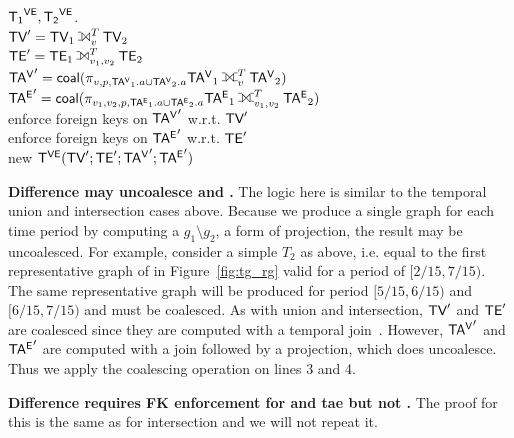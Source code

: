 \begin{algorithm}[b]
\caption{Temporal graph difference in \tve.}
\begin{algorithmic}[1]
\REQUIRE $\mathsf{{T_1}^{VE}}, \mathsf{{T_2}^{VE}}$.\\
\STATE $\tv' = \tv_1 \leftouterjoin^T_v \tv_2$\\ 
\STATE $\te' = \te_1 \leftouterjoin^T_{v_1,v_2} \te_2$\\ 
\STATE $\tav' = \cl (\pi_{v,p,\tav_1.a \cup \tav_2.a}\tav_1 \fullouterjoin^T_v \tav_2)$\\
\STATE $\tae' = \cl (\pi_{v_1,v_2,p,\tae_1.a \cup \tae_2.a}\tae_1 \fullouterjoin^T_{v_1,v_2} \tae_2)$\\
\STATE enforce foreign keys on $\mathsf{TA^{V}}'$ w.r.t. $\textsf{TV}'$\\ 
\STATE enforce foreign keys on $\mathsf{TA^{E}}'$ w.r.t. $\textsf{TE}'$\\ 
\RETURN new $\mathsf{T^{VE}} (\textsf{TV}';\textsf{TE}';\mathsf{TA^{V}}';\mathsf{TA^{E}}')$\\
\end{algorithmic}
\label{alg:diff}
\end{algorithm}


{\bf Difference may uncoalesce \tve and \trg.}  The logic here is
similar to the temporal union and intersection cases above.  Because
we produce a single graph for each time period by computing a $g_1
\setminus g_2$, a form of projection, the result may be uncoalesced.
For example, consider a simple \tg $T_2$ as above, i.e. equal to the
first representative graph of  in Figure~\ref{fig:tg_rg}
valid for a period of $[2/15, 7/15)$.  The same representative graph
  will be produced for period $[5/15, 6/15)$ and $[6/15, 7/15)$ and
      must be coalesced.  As with union and intersection, $\textsf{TV}'$ and
      $\textsf{TE}'$ are coalesced since they are computed with a temporal
      join~\cite{DBLP:conf/vldb/BohlenSS96}.  However, $\mathsf{TA^{V}}'$ and
      $\mathsf{TA^{E}}'$ are computed with a join followed by a projection, which
      does uncoalesce.  Thus we apply the coalescing operation on
      lines 3 and 4.

{\bf Difference requires FK enforcement for \tav and tae but not \te.}
The proof for this is the same as for intersection and we will not
repeat it.


